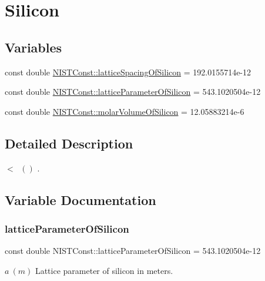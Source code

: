 \hypertarget{group___silicon}{}\section{Silicon}
\label{group___silicon}
\subsection*{Variables}
\begin{DoxyCompactItemize}
\item 
const double \hyperlink{group___silicon_ga439c53134da8a910d17c996b136da7a8}{N\+I\+S\+T\+Const\+::lattice\+Spacing\+Of\+Silicon} = 192.\+0155714e-\/12
\item 
const double \hyperlink{group___silicon_ga8ab64e0d4d7e0ebde43f1dd5f4ff68bf}{N\+I\+S\+T\+Const\+::lattice\+Parameter\+Of\+Silicon} = 543.\+1020504e-\/12
\item 
const double \hyperlink{group___silicon_gaf084f6d4668f778d204cd782269f082c}{N\+I\+S\+T\+Const\+::molar\+Volume\+Of\+Silicon} = 12.\+05883214e-\/6
\end{DoxyCompactItemize}


\subsection{Detailed Description}
$<$ $ \ ()$ . 

\subsection{Variable Documentation}
\mbox{\label{group___silicon_ga8ab64e0d4d7e0ebde43f1dd5f4ff68bf}} 
\subsubsection{\texorpdfstring{lattice\+Parameter\+Of\+Silicon}{latticeParameterOfSilicon}}
{\footnotesize\ttfamily const double N\+I\+S\+T\+Const\+::lattice\+Parameter\+Of\+Silicon = 543.\+1020504e-\/12}

$a \ (m)$ Lattice parameter of silicon in meters. \mbox{\label{group___silicon_ga439c53134da8a910d17c996b136da7a8}} 
